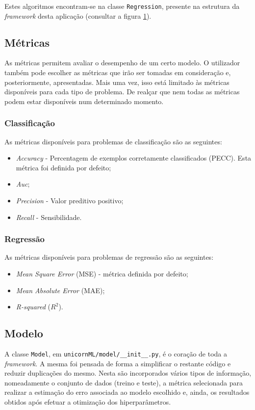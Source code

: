 \documentclass[a4paper]{report}
\begin{document}
{			Estes algoritmos encontram-se na classe \texttt{Regression}, presente na estrutura da \textit{framework} desta aplicação (consultar a figura \hyperref[fig:1]{1}).

		\subsection{Métricas} \label{subsec:Metrics}
		As métricas permitem avaliar o desempenho de um certo modelo. 
		O utilizador também pode escolher as métricas que irão ser tomadas em consideração e, posteriormente, apresentadas.
		Mais uma vez, isso está limitado às métricas disponíveis para cada tipo de problema.
		De realçar que nem todas as métricas podem estar disponíveis num determinado momento.

            \subsubsection{Classificação} \label{sssec:Classification2}
			As métricas disponíveis para problemas de classificação são as seguintes:
			\begin{itemize}
				\item \textit{Accuracy} - Percentagem de exemplos corretamente classificados (PECC). Esta métrica foi definida por defeito;
				\item \textit{Auc};
				\item \textit{Precision} - Valor preditivo positivo;
				\item \textit{Recall} - Sensibilidade.
			\end{itemize}

            \subsubsection{Regressão} \label{sssec:Regression2}
			As métricas disponíveis para problemas de regressão são as seguintes:
			\begin{itemize}
				\item \textit{Mean Square Error} (MSE) - métrica definida por defeito;
				\item \textit{Mean Absolute Error} (MAE);
				\item \textit{R-squared} ($R^{2}$).
			\end{itemize}

		\subsection{Modelo}
		A classe \texttt{Model}, em \texttt{unicornML/model/\_\_init\_\_.py}, é o coração de toda a \textit{framework}.
		A mesma foi pensada de forma a simplificar o restante código e reduzir duplicações do mesmo.
		Nesta são incorporados vários tipos de informação, nomeadamente o conjunto de dados (treino e teste), a métrica selecionada para realizar a estimação do erro associada ao modelo escolhido e, ainda, os resultados obtidos após efetuar a otimização dos hiperparâmetros.

}
\end{document}
